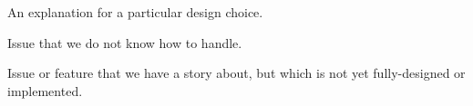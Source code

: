 \begin{rationale}
  An explanation for a particular design choice.
\end{rationale}

\begin{openissue}
  Issue that we do not know how to handle.
\end{openissue}

\clearpage
\begin{future}
  Issue or feature that we have a story about, but which is not yet
  fully-designed or implemented. 
\end{future}
